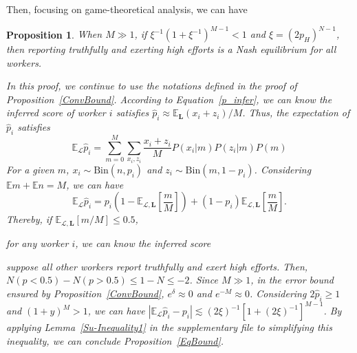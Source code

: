\documentclass{article}
\makeatletter
\newtheorem{proposition}[theorem]{Proposition}
\renewenvironment{proof}[1][\proofname]{\par
  \vspace{-\topsep}%
  \pushQED{\qed}%
  \normalfont
  \topsep0pt \partopsep0pt %
  \trivlist
  \item[\hskip\labelsep
        \itshape
    #1\@addpunct{.}]\ignorespaces
}{%
  \popQED\endtrivlist\@endpefalse
  \addvspace{0pt plus 0pt} %
}
\makeatother
\begin{document}
Then, focusing on game-theoretical analysis, we can have
\begin{proposition}
\label{OSEqulibrium}
When $M\gg 1$, if $\xi^{-1}(1+\xi^{-1})^{M-1}<1$ and $\xi=(2p_H)^{N-1}$, then reporting truthfully and exerting high efforts is a Nash equilibrium for all workers.
\begin{proof}
In this proof, we continue to use the notations defined in the proof of Proposition~\ref{ConvBound}.
According to Equation~\ref{p_infer}, we can know the inferred score of worker $i$ satisfies $\hat{p}_i\approx \mathbb{E}_{\bm{L}}(x_i+z_i)/M$. Thus, the expectation of $\hat{p}_i$ satisfies
\begin{equation}
\mathbb{E}_{\mathcal{L}}\hat{p}_i=\sum_{m=0}^{M}\sum_{x_i,z_i}\frac{x_i+z_i}{M}P(x_i|m)P(z_i|m)P(m)
\end{equation}
For a given $m$, $x_i\sim\mathrm{Bin}(n, p_i)$ and $z_i\sim\mathrm{Bin}(m, 1-p_i)$.
Considering $\mathbb{E}m+\mathbb{E}n = M$, we can have
\begin{equation}
\mathbb{E}_{\mathcal{L}}\hat{p}_i = p_i\left(1-\mathbb{E}_{\mathcal{L},\bm{L}}\left[\frac{m}{M}\right]\right)+(1-p_i)\mathbb{E}_{\mathcal{L},\bm{L}}\left[\frac{m}{M}\right].
\end{equation}
Thereby, if $\mathbb{E}_{\mathcal{L},\bm{L}}\left[m/M\right]\leq 0.5$, 

for any worker $i$, we can know the inferred score 

suppose all other workers report truthfully and exert high efforts. Then, $N(p<0.5)-N(p>0.5)\leq 1-N\leq -2$. Since $M\gg 1$, in the error bound ensured by Proposition~\ref{ConvBound}, $e^{\delta}\approx 0$ and $e^{-M}\approx0$. Considering $2\hat{p}_i\geq 1$ and $(1+y)^{M}>1$, we can have
$|\mathbb{E}_{\mathcal{L}}\hat{p}_i-p_i|\lesssim (2\xi)^{-1}[1+(2\xi)^{-1}]^{M-1}$. By applying Lemma~\ref{Su-Inequality1} in the supplementary file to simplifying this inequality, we can conclude Proposition~\ref{EqBound}.
\end{proof}
\end{proposition}
\end{document}
